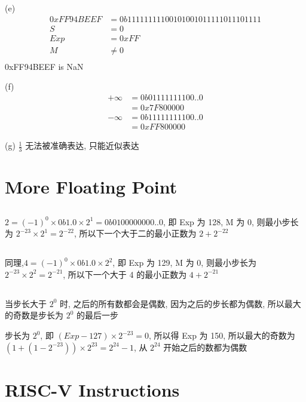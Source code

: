 \documentclass[UTF8,nofonts]{ctexart}
\begin{document}
(e)
\begin{align*}
	0xFF94BEEF & = 0b 1 11111111 00101001011111011101111 \\
	S          & = 0                                     \\
	Exp        & = 0xFF                                  \\
	M          & \neq 0                                  \\
\end{align*}
0xFF94BEEF is NaN

(f)
\begin{align*}
	+\infty & = 0b0 11111111 00..0 \\
	        & = 0x7F800000         \\
	-\infty & = 0b1 11111111 00..0 \\
	        & = 0xFF800000
\end{align*}

(g)
$\frac{1}{3}$ 无法被准确表达, 只能近似表达

\section{More Floating Point}
\subsection{}
$2 = (-1)^0 \times 0b1.0 \times 2^1 = 0b 0 10000000 0..0$, 即 Exp 为 128, M 为 0, 则最小步长为 $2^{-23}\times 2^1 = 2^{-22}$, 所以下一个大于二的最小正数为 $2+2^{-22}$

\subsection{}
同理,$4 = (-1)^0 \times 0b1.0 \times 2^2$, 即 Exp 为 129, M 为 0, 则最小步长为 $2^{-23} \times 2^2=2^{-21}$, 所以下一个大于 4 的最小正数为 $4 + 2^{-21}$

\subsection{}
当步长大于 $2^0$ 时, 之后的所有数都会是偶数, 因为之后的步长都为偶数, 所以最大的奇数是步长为 $2^0$ 的最后一步

步长为 $2^0$, 即 $(Exp - 127) \times 2^{-23} = 0$, 所以得 Exp 为 150, 所以最大的奇数为 $(1 + (1-2^{-23}))\times 2^{23} = 2^{24} - 1$, 从 $2^{24}$ 开始之后的数都为偶数

\section{RISC-V Instructions}
\end{document}
